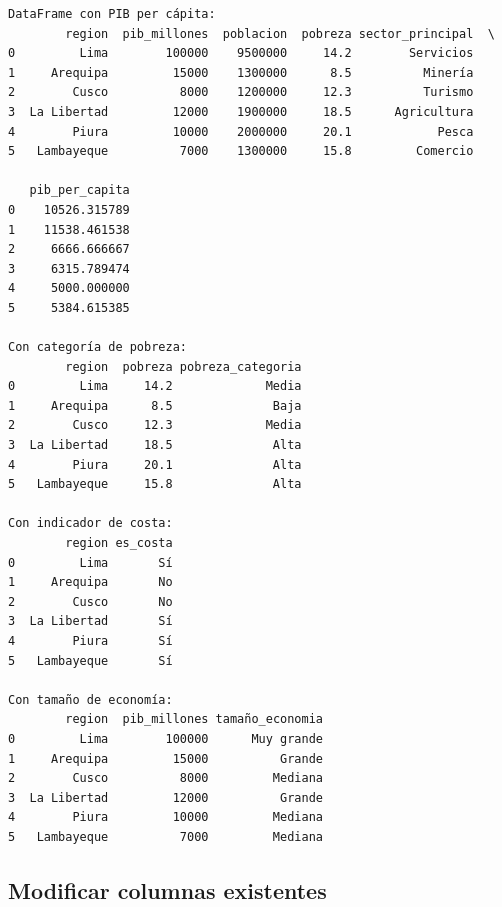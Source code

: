 \documentclass[
  doc,
  floatsintext,
  longtable,
  a4paper,
  nolmodern,
  notxfonts,
  notimes,
  12pt,
  colorlinks=true,linkcolor=blue,citecolor=blue,urlcolor=blue]{apa7}
\begin{document}
\begin{verbatim}
DataFrame con PIB per cápita:
        region  pib_millones  poblacion  pobreza sector_principal  \
0         Lima        100000    9500000     14.2        Servicios   
1     Arequipa         15000    1300000      8.5          Minería   
2        Cusco          8000    1200000     12.3          Turismo   
3  La Libertad         12000    1900000     18.5      Agricultura   
4        Piura         10000    2000000     20.1            Pesca   
5   Lambayeque          7000    1300000     15.8         Comercio   

   pib_per_capita  
0    10526.315789  
1    11538.461538  
2     6666.666667  
3     6315.789474  
4     5000.000000  
5     5384.615385  

Con categoría de pobreza:
        region  pobreza pobreza_categoria
0         Lima     14.2             Media
1     Arequipa      8.5              Baja
2        Cusco     12.3             Media
3  La Libertad     18.5              Alta
4        Piura     20.1              Alta
5   Lambayeque     15.8              Alta

Con indicador de costa:
        region es_costa
0         Lima       Sí
1     Arequipa       No
2        Cusco       No
3  La Libertad       Sí
4        Piura       Sí
5   Lambayeque       Sí

Con tamaño de economía:
        region  pib_millones tamaño_economia
0         Lima        100000      Muy grande
1     Arequipa         15000          Grande
2        Cusco          8000         Mediana
3  La Libertad         12000          Grande
4        Piura         10000         Mediana
5   Lambayeque          7000         Mediana
\end{verbatim}

\subsection{Modificar columnas
existentes}\label{modificar-columnas-existentes}
\end{document}
